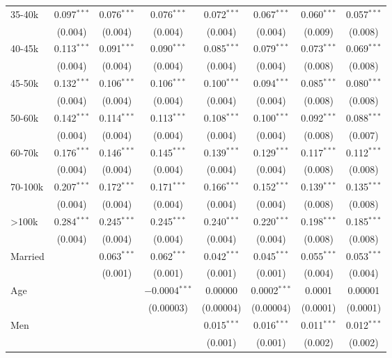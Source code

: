 \begin{table}[!htbp]
\begin{tabular}{@{\extracolsep{5pt}}lccccccc}
  35-40k & 0.097$^{***}$ & 0.076$^{***}$ & 0.076$^{***}$ & 0.072$^{***}$ & 0.067$^{***}$ & 0.060$^{***}$ & 0.057$^{***}$ \\ 
  & (0.004) & (0.004) & (0.004) & (0.004) & (0.004) & (0.009) & (0.008) \\ 
  40-45k & 0.113$^{***}$ & 0.091$^{***}$ & 0.090$^{***}$ & 0.085$^{***}$ & 0.079$^{***}$ & 0.073$^{***}$ & 0.069$^{***}$ \\ 
  & (0.004) & (0.004) & (0.004) & (0.004) & (0.004) & (0.008) & (0.008) \\ 
  45-50k & 0.132$^{***}$ & 0.106$^{***}$ & 0.106$^{***}$ & 0.100$^{***}$ & 0.094$^{***}$ & 0.085$^{***}$ & 0.080$^{***}$ \\ 
  & (0.004) & (0.004) & (0.004) & (0.004) & (0.004) & (0.008) & (0.008) \\ 
  50-60k & 0.142$^{***}$ & 0.114$^{***}$ & 0.113$^{***}$ & 0.108$^{***}$ & 0.100$^{***}$ & 0.092$^{***}$ & 0.088$^{***}$ \\ 
  & (0.004) & (0.004) & (0.004) & (0.004) & (0.004) & (0.008) & (0.007) \\ 
  60-70k & 0.176$^{***}$ & 0.146$^{***}$ & 0.145$^{***}$ & 0.139$^{***}$ & 0.129$^{***}$ & 0.117$^{***}$ & 0.112$^{***}$ \\ 
  & (0.004) & (0.004) & (0.004) & (0.004) & (0.004) & (0.008) & (0.008) \\ 
  70-100k & 0.207$^{***}$ & 0.172$^{***}$ & 0.171$^{***}$ & 0.166$^{***}$ & 0.152$^{***}$ & 0.139$^{***}$ & 0.135$^{***}$ \\ 
  & (0.004) & (0.004) & (0.004) & (0.004) & (0.004) & (0.008) & (0.008) \\ 
  >100k & 0.284$^{***}$ & 0.245$^{***}$ & 0.245$^{***}$ & 0.240$^{***}$ & 0.220$^{***}$ & 0.198$^{***}$ & 0.185$^{***}$ \\ 
  & (0.004) & (0.004) & (0.004) & (0.004) & (0.004) & (0.008) & (0.008) \\ 
  Married &  & 0.063$^{***}$ & 0.062$^{***}$ & 0.042$^{***}$ & 0.045$^{***}$ & 0.055$^{***}$ & 0.053$^{***}$ \\ 
  &  & (0.001) & (0.001) & (0.001) & (0.001) & (0.004) & (0.004) \\ 
  Age &  &  & $-$0.0004$^{***}$ & 0.00000 & 0.0002$^{***}$ & 0.0001 & 0.00001 \\ 
  &  &  & (0.00003) & (0.00004) & (0.00004) & (0.0001) & (0.0001) \\ 
  Men &  &  &  & 0.015$^{***}$ & 0.016$^{***}$ & 0.011$^{***}$ & 0.012$^{***}$ \\ 
  &  &  &  & (0.001) & (0.001) & (0.002) & (0.002) \\ 

\end{tabular}
\end{table}
